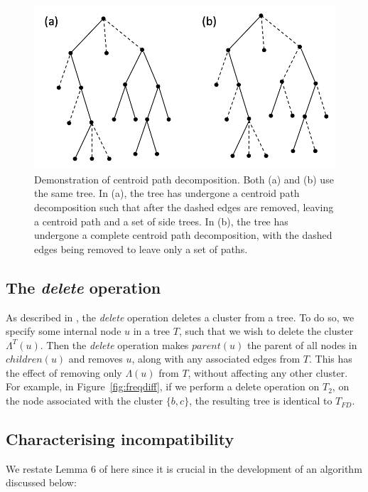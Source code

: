 \documentclass{article}
\newcommand{\leafset}{\Lambda}
\begin{document}
    \begin{figure}[h]
        \includegraphics[scale=0.5]{centroid}
        \centering
        \caption{Demonstration of centroid path decomposition. Both (a) and (b) use the same tree. In (a), the tree has undergone a centroid path decomposition such that after the dashed edges are removed, leaving a centroid path and a set of side trees. In (b), the tree has undergone a complete centroid path decomposition, with the dashed edges being removed to leave only a set of paths.}
        \label{fig:centroid}
    \end{figure}

    \subsection{The \textit{delete} operation}
    \label{subsec:delete}

    As described in \cite{jansson2018algorithms}, the \textit{delete} operation deletes a cluster from a tree. To do so, we specify some internal node $u$ in a tree $T$, such that we wish to delete the cluster $\leafset^{T}(u)$. Then the \textit{delete} operation makes $parent(u)$ the parent of all nodes in $children(u)$ and removes $u$, along with any associated edges from $T$. This has the effect of removing only $\leafset(u)$ from $T$, without affecting any other cluster. For example, in Figure~\ref{fig:freqdiff}, if we perform a delete operation on $T_2$, on the node associated with the cluster $\{b, c\}$, the resulting tree is identical to $T_{FD}$.

    \subsection{Characterising incompatibility}

    We restate Lemma 6 of \cite{jansson2018algorithms} here since it is crucial in the development of an algorithm discussed below:
    \newline
\end{document}
